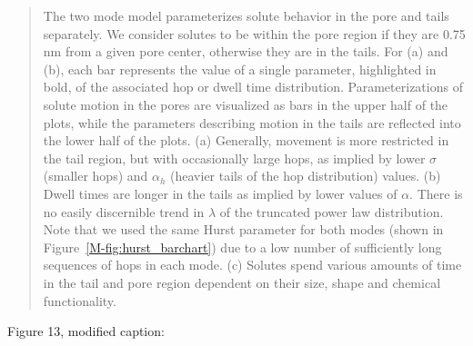 \documentclass{article}
\begin{document}
\begin{enumerate}[label={Comment \theenumi :}, leftmargin=3.9\parindent]
	    \begin{quote}
		  The two mode model parameterizes solute behavior in the pore and tails
	      separately. We consider solutes to be within the pore region if they
	      are 0.75 nm from a given pore center, otherwise they are in the
	      tails. 
	      For (a) and (b), each bar represents the value of a single parameter, 
	      highlighted in bold, of the associated hop or dwell time distribution.
	      Parameterizations of solute motion in the pores are visualized as bars
	      in the upper half of the plots, while the parameters describing motion 
	      in the tails are reflected into the lower half of the plots.
	      (a) Generally, movement is more restricted in the tail region, but 
	      with occasionally large hops, as implied by lower $\sigma$ (smaller
	      hops) and $\alpha_h$ (heavier tails of the hop distribution) values.
	      (b) Dwell times are longer in the tails as implied by lower values 
	      of $\alpha$.
	      There is no easily discernible trend in $\lambda$ of the
	      truncated power law distribution. Note that we used the same Hurst
	      parameter for both modes (shown in Figure~\ref{M-fig:hurst_barchart})
	      due to a low number of sufficiently long sequences of hops in each
	      mode. (c) Solutes spend various amounts of time in the tail and pore
	      region dependent on their size, shape and chemical functionality.
	  
        \end{quote}
        
        Figure 13, modified caption:
        
        \begin{quote}
        

\end{quote}
\end{enumerate}
\end{document}
